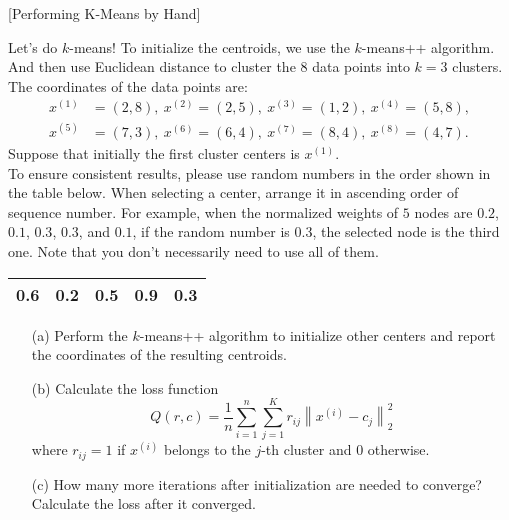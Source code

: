 \item {} [Performing K-Means by Hand]

Let's do $k$-means! To initialize the centroids, we use the $k$-means++ algorithm. And then use Euclidean distance to cluster the 8 data points into $k=3$ clusters. The coordinates of the data points are:
\begin{align*}
    x^{(1)} & = (2,8),  \ x^{(2)} = (2,5), \ x^{(3)} = (1,2), \ x^{(4)} = (5,8), \\
    x^{(5)} & = (7,3),  \ x^{(6)} = (6,4), \ x^{(7)} = (8,4), \ x^{(8)} = (4,7).
\end{align*}
Suppose that initially the first cluster centers is $x^{(1)}$. \\
{\color{blue} To ensure consistent results, please use random numbers in the order shown in the table below. When selecting a center, arrange it in ascending order of sequence number. For example, when the normalized weights of $5$ nodes are $0.2$, $0.1$, $0.3$, $0.3$, and $0.1$, if the random number is $0.3$, the selected node is the third one. Note that you don't necessarily need to use all of them.}
\begin{table*}[h]
    \centering
    \begin{tabular}{|c|c|c|c|c|}
    \hline
    0.6 & 0.2 & 0.5 & 0.9 & 0.3 \\
    \hline
    \end{tabular}
\end{table*}

\begin{itemize}
\item[(a)] Perform the $k$-means++ algorithm to initialize other centers and report the coordinates of the resulting centroids. ~
\item[(b)] Calculate the loss function
$$Q(r,c) = \dfrac{1}{n} \sum_{i=1}^n \sum_{j=1}^K r_{ij}\left\|x^{(i)} - c_j\right\|_2^2$$
where $r_{ij} = 1$ if $x^{(i)}$ belongs to the $j$-th cluster and 0 otherwise. ~
\item[(c)] How many more iterations after initialization are needed to converge? ~ Calculate the loss after it converged. ~
\end{itemize}

\solution












\newpage